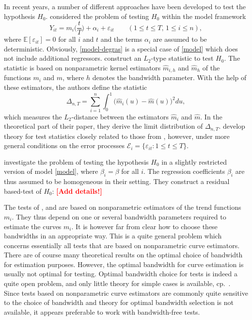 \documentclass[a4paper,12pt]{article}
\begin{document}
In recent years, a number of different approaches have been developed to test the hypothesis $H_0$. \cite{DegrasWu2012} considered the problem of testing $H_0$ within the model framework
\begin{equation}\label{model-degras}
Y_{it} = m_i \Big( \frac{t}{T} \Big) + \alpha_i + \varepsilon_{it} \qquad (1 \le t \le T, \, 1 \le i \le n), 
\end{equation}
where $\mathbb{E}[\varepsilon_{it}] = 0$ for all $i$ and $t$ and the terms $\alpha_i$ are assumed to be deterministic. Obviously, \eqref{model-degras} is a special case of \eqref{model} which does not include additional regressors. \cite{DegrasWu2012} construct an $L_2$-type statistic to test $H_0$. The statistic is based on nonparametric kernel estimators $\hat{m}_{i,h}$ and $\hat{m}_h$ of the functions $m_i$ and $m$, where $h$ denotes the bandwidth parameter. With the help of these estimators, the authors define the statistic
\[ \Delta_{n,T} = \sum_{i=1}^n \int_0^1 \big(\hat{m}_i(u) - \hat{m}(u)\big)^2 du, \] 
which measures the $L_2$-distance between the estimators $\hat{m}_i$ and $\hat{m}$. In the theoretical part of their paper, they derive the limit distribution of $\Delta_{n,T}$. 
\cite{ChenWu2018} develop theory for test statistics closely related to those from \cite{DegrasWu2012}, however, under more general conditions on the error processes $\mathcal{E}_i = \{ \varepsilon_{it}: 1 \le t \le T \}$. 


\cite{Zhang2012} investigate the problem of testing the hypothesis $H_0$ in a slightly restricted version of model \eqref{model}, where $\beta_i = \beta$ for all $i$. The regression coefficients $\beta_i$ are thus assumed to be homogeneous in their setting. They construct a residual based-test of $H_0$: \textcolor{red}{\textbf{[Add details!]}}


The tests of \cite{Zhang2012}, \cite{DegrasWu2012} and \cite{ChenWu2018} are based on nonparametric estimators of the trend functions $m_i$. They thus depend on one or several bandwidth parameters required to estimate the curves $m_i$. It is however far from clear how to choose these bandwidths in an appropriate way. This is a quite general problem which concerns essentially all tests that are based on nonparametric curve estimators. There are of course many theoretical results on the optimal choice of bandwidth for estimation purposes. However, the optimal bandwidth for curve estimation is usually not optimal for testing. Optimal bandwidth choice for tests is indeed a quite open problem, and only little theory for simple cases is available, cp.\ \cite{GaoGijbels2008}. Since tests based on nonparametric curve estimators are commonly quite sensitive to the choice of bandwidth and theory for optimal bandwidth selection is not available, it appears preferable to work with bandwidth-free tests. 
\end{document}
